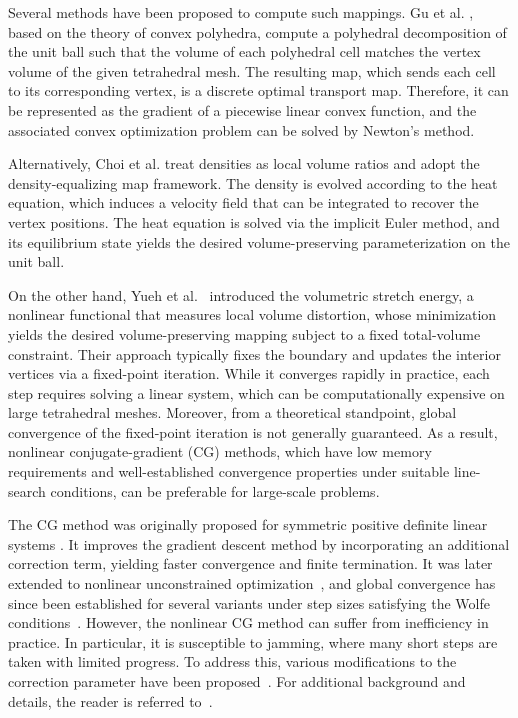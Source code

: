 \documentclass[11pt,a4paper]{article}
\begin{document}
Several methods have been proposed to compute such mappings. Gu et al. \cite{GuLS16,SuCL17}, based on the theory of convex polyhedra, compute a polyhedral decomposition of the unit ball such that the volume of each polyhedral cell matches the vertex volume of the given tetrahedral mesh. The resulting map, which sends each cell to its corresponding vertex, is a discrete optimal transport map. Therefore, it can be represented as the gradient of a piecewise linear convex function, and the associated convex optimization problem can be solved by Newton's method.

Alternatively, Choi et al. \cite{ChCh21,LyCC25} treat densities as local volume ratios and adopt the density-equalizing map framework. The density is evolved according to the heat equation, which induces a velocity field that can be integrated to recover the vertex positions. The heat equation is solved via the implicit Euler method, and its equilibrium state yields the desired volume-preserving parameterization on the unit ball.

On the other hand, Yueh et al.~\cite{YuLL19,YuLL20,HuLL23,TaLL25} introduced the volumetric stretch energy, a nonlinear functional that measures local volume distortion, whose minimization yields the desired volume-preserving mapping subject to a fixed total-volume constraint. Their approach typically fixes the boundary and updates the interior vertices via a fixed-point iteration. While it converges rapidly in practice, each step requires solving a linear system, which can be computationally expensive on large tetrahedral meshes. Moreover, from a theoretical standpoint, global convergence of the fixed-point iteration is not generally guaranteed. As a result, nonlinear conjugate-gradient (CG) methods, which have low memory requirements and well-established convergence properties under suitable line-search conditions, can be preferable for large-scale problems.

The CG method was originally proposed for symmetric positive definite linear systems \cite{HeSt52}. It improves the gradient descent method by incorporating an additional correction term, yielding faster convergence and finite termination. It was later extended to nonlinear unconstrained optimization~\cite{FlRe64}, and global convergence has since been established for several variants under step sizes satisfying the Wolfe conditions~\cite{ALBA85,LiHY95,DaYu96}.  However, the nonlinear CG method can suffer from inefficiency in practice. In particular, it is susceptible to jamming, where many short steps are taken with limited progress. To address this, various modifications to the correction parameter have been proposed~\cite{PoRi69,Flet00,DaYu99,HaZh05}. For additional background and details, the reader is referred to~\cite{DaHL00,Hage06}.
\end{document}

